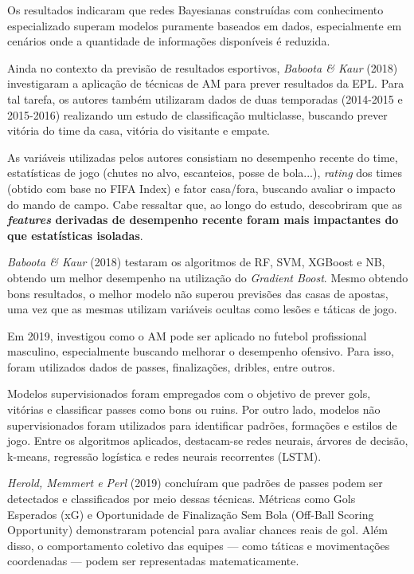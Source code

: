 Os resultados indicaram que redes Bayesianas construídas com conhecimento especializado superam modelos puramente baseados em dados, especialmente em cenários onde a quantidade de informações disponíveis é reduzida. 

Ainda no contexto da previsão de resultados esportivos, \textit{Baboota \& Kaur} (2018) investigaram a aplicação de técnicas de AM para prever resultados da EPL. Para tal tarefa, os autores também utilizaram dados de duas temporadas (2014-2015 e 2015-2016) realizando um estudo de classificação multiclasse, buscando prever vitória do time da casa, vitória do visitante e empate.

As variáveis utilizadas pelos autores consistiam no desempenho recente do time, estatísticas de jogo (chutes no alvo, escanteios, posse de bola...), \textit{rating} dos times (obtido com base no FIFA Index) e fator casa/fora, buscando avaliar o impacto do mando de campo. Cabe ressaltar que, ao longo do estudo, descobriram que as \textbf{\textit{features} derivadas de desempenho recente foram mais impactantes do que estatísticas isoladas}.

\textit{Baboota \& Kaur} (2018) testaram os algoritmos de RF, SVM, XGBoost e NB, obtendo um melhor desempenho na utilização do \textit{Gradient Boost}. Mesmo obtendo bons resultados, o melhor modelo não superou previsões das casas de apostas, uma vez que as mesmas utilizam variáveis ocultas como lesões e táticas de jogo.

Em 2019, \cite{Herold2019} investigou como o AM pode ser aplicado no futebol profissional masculino, especialmente buscando melhorar o desempenho ofensivo. Para isso, foram utilizados dados de passes, finalizações, dribles, entre outros.

Modelos supervisionados foram empregados com o objetivo de prever gols, vitórias e classificar passes como bons ou ruins. Por outro lado, modelos não supervisionados foram utilizados para identificar padrões, formações e estilos de jogo. Entre os algoritmos aplicados, destacam-se redes neurais, árvores de decisão, k-means, regressão logística e redes neurais recorrentes (LSTM). \cite{Herold2019}

\textit{Herold, Memmert e Perl} (2019) concluíram que padrões de passes podem ser detectados e classificados por meio dessas técnicas. Métricas como Gols Esperados (xG) e Oportunidade de Finalização Sem Bola (Off-Ball Scoring Opportunity) demonstraram potencial para avaliar chances reais de gol. Além disso, o comportamento coletivo das equipes — como táticas e movimentações coordenadas — podem ser representadas matematicamente.

